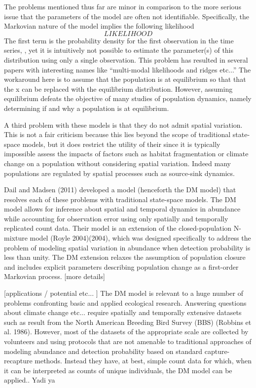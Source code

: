 \documentclass[12pt]{article}
\begin{document}
The problems mentioned thus far are minor in comparison to the more
serious issue that the parameters of the model are often not
identifiable. Specifically, the Markovian nature of the model implies
the following likelihood
\[
LIKELIHOOD
\]
The first term is the probability density for the first observation in
the time series,  , yet it is intuitively not possible to estimate the
parameter(s) of this distribution using only a single
observation. This problem has resulted in several papers with
interesting names like ``multi-modal likelihoods and ridges etc...''
The workaround here is to assume that the population is at equilibrium
so that that the x can be replaced with the equilibrium
distribution. However, assuming equilibrium defeats the objective of
many studies of population dynamics, namely determining if and why a
population is at equilibrium.

A third problem with these models is that they do not admit
spatial variation. This is not a fair criticism because this
lies beyond the scope of traditional state-space models, but
it does restrict the utility of their since it is typically
impossible assess the impacts of factors such as habitat
fragmentation or climate change on a population without
considering spatial variation. Indeed many populations are
regulated by spatial processes such as source-sink dynamics.

Dail and Madsen (2011) developed a model (henceforth the DM model)
that resolves each of these problems with traditional state-space
models. The DM model allows for inference about spatial and temporal
dynamics in abundance while accounting for observation error using
only spatially and temporally replicated count data.  Their model is
an extension of the closed-population N-mixture model (Royle
2004)(2004), which was designed specifically to address the problem of
modeling spatial variation in abundance when detection probability is
less than unity. The DM extension relaxes the assumption of population
closure and includes explicit parameters describing population change
as a first-order Markovian process. [more details]

[applications / potential etc... ] The DM model is relevant to a huge
number of problems confronting basic and applied ecological
research. Answering questions about climate change etc... require
spatially and temporally extensive datasets such as result from the
North American Breeding Bird Survey (BBS) (Robbins et
al. 1986). However, most of the datasets of the appropriate scale are
collected by volunteers and using protocols that are not amenable to
traditional approaches of modeling abundance and detection probability
based on standard capture-recapture methods. Instead they have, at
best, simple count data for which, when it can be interpreted as
counts of unique individuals, the DM model can be applied.. Yadi ya
\end{document}
